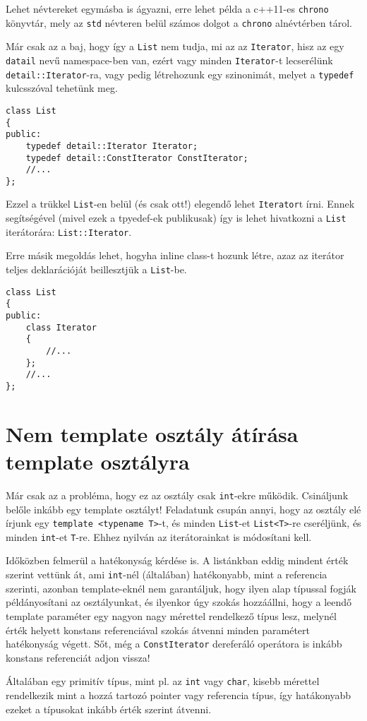 \documentclass[a4paper,11.5pt,table]{article}
\begin{document}
	Lehet névtereket egymásba is ágyazni, erre lehet példa a c++11-es \texttt{chrono} könyvtár, mely az \texttt{std} névteren belül számos dolgot a \texttt{chrono} alnévtérben tárol.
	
	\medskip
	Már csak az a baj, hogy így a \texttt{List} nem tudja, mi az az \texttt{Iterator}, hisz az egy \texttt{datail} nevű namespace-ben van, ezért vagy minden \texttt{Iterator}-t lecserélünk \texttt{detail::Iterator}-ra, vagy pedig létrehozunk egy szinonimát, melyet a \texttt{typedef} kulcsszóval tehetünk meg.
\begin{lstlisting}
class List
{
public:
	typedef detail::Iterator Iterator;
	typedef detail::ConstIterator ConstIterator;
	//...
};
\end{lstlisting}
	Ezzel a trükkel \texttt{List}-en belül (és csak ott!) elegendő lehet \texttt{Iterator}t írni. Ennek segítségével (mivel ezek a tpyedef-ek publikusak) így is lehet hivatkozni a \texttt{List} iterátorára: \texttt{List::Iterator}.
	
	\medskip
	Erre másik megoldás lehet, hogyha inline class-t hozunk létre, azaz az iterátor teljes deklarációját beillesztjük a \texttt{List}-be.
\begin{lstlisting}
class List
{
public:
	class Iterator
	{
		//...
	};
	//...
};
\end{lstlisting}
	\section{Nem template osztály átírása template osztályra}
	Már csak az a probléma, hogy ez az osztály csak \texttt{int}-ekre működik. Csináljunk belőle inkább egy template osztályt! Feladatunk csupán annyi, hogy az osztály elé írjunk egy \texttt{template <typename T>}-t, és minden \texttt{List}-et \texttt{List<T>}-re cseréljünk, és minden \texttt{int}-et \texttt{T}-re. Ehhez nyilván az iterátorainkat is módosítani kell.
	
	\medskip
	Időközben felmerül a hatékonyság kérdése is. A listánkban eddig mindent érték szerint vettünk át, ami \texttt{int}-nél (általában) hatékonyabb, mint a referencia szerinti, azonban template-eknél nem garantáljuk, hogy ilyen alap típussal fogják példányosítani az osztályunkat, és ilyenkor úgy szokás hozzáállni, hogy a leendő template paraméter egy nagyon nagy mérettel rendelkező típus lesz, melynél érték helyett konstans referenciával szokás átvenni minden paramétert hatékonyság végett. Sőt, még a \texttt{ConstIterator} dereferáló operátora is inkább konstans referenciát adjon vissza!
	\begin{note}
		Általában egy primitív típus, mint pl. az \texttt{int} vagy \texttt{char}, kisebb mérettel rendelkezik mint a hozzá tartozó pointer vagy referencia típus, így hatákonyabb ezeket a típusokat inkább érték szerint átvenni.
	\end{note}
	
\end{document}
